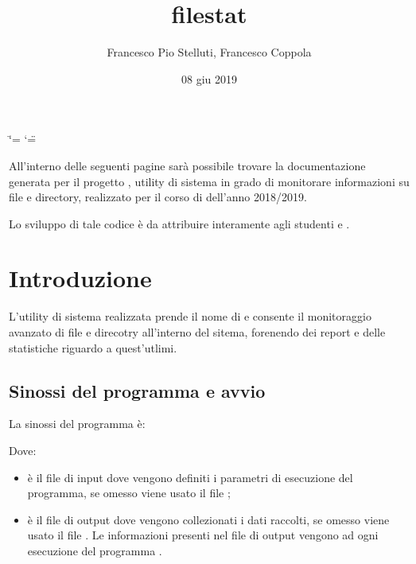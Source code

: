 \documentclass[letterpaper,10pt,italian,openany,oneside]{sphinxmanual}
\title{filestat}
\date{08 giu 2019}
\author{Francesco Pio Stelluti, Francesco Coppola}
\begin{document}
\ifdefined\shorthandoff
  \ifnum\catcode`\=\string=\active\shorthandoff{=}\fi
  \ifnum\catcode`\"=\active{}\fi
\fi

\pagestyle{empty}
\sphinxmaketitle
\pagestyle{plain}
\sphinxtableofcontents
\pagestyle{normal}
\label{\detokenize{index::doc}}


All’interno delle seguenti pagine sarà possibile trovare la documentazione
generata per il progetto , utility di sistema in grado di monitorare informazioni
su file e directory, realizzato per il corso di 
dell’anno 2018/2019.

Lo sviluppo di tale codice è da attribuire interamente agli studenti  e .


\chapter{Introduzione}
\label{\detokenize{introduzione:introduzione}}\label{\detokenize{introduzione::doc}}\begin{quote}

\end{quote}

L’utility di sistema realizzata prende il nome di  e consente il monitoraggio avanzato di
file e direcotry all’interno del sitema, forenendo dei report e delle statistiche riguardo a quest’utlimi.


\section{Sinossi del programma e avvio}
\label{\detokenize{introduzione:sinossi-del-programma-e-avvio}}
La sinossi del programma è:

\begin{sphinxVerbatim}[commandchars=\\\{\}]
 \PYG{p}{[}\PYG{p}{]} \PYG{p}{[}\PYG{p}{]} \PYG{p}{[}\PYG{p}{]}
\end{sphinxVerbatim}

Dove:
\begin{itemize}
\item {} 
 è il file di input dove vengono definiti i parametri di esecuzione del programma, se omesso viene usato il file ;

\item {} 
 è il file di output dove vengono collezionati i dati raccolti, se omesso viene usato il file . Le informazioni presenti nel file di output vengono  ad ogni esecuzione del programma .

\end{itemize}
\end{document}
